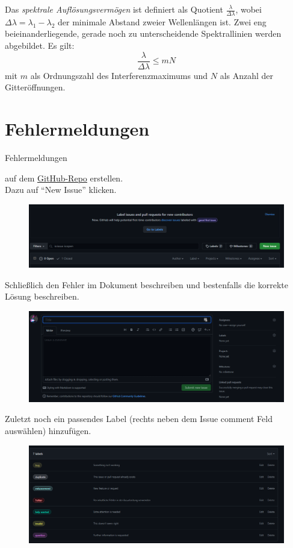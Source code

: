 \documentclass[a4paper, 11pt, ngerman, parskip=half-]{scrartcl}
\begin{document}
Das \textit{spektrale Auflösungsvermögen} ist definiert als Quotient $\frac{\lambda}{\Delta \lambda}$, wobei $\Delta \lambda = \lambda_1 - \lambda_2$
der minimale Abstand zweier Wellenlängen ist. Zwei eng beieinanderliegende, gerade noch zu unterscheidende Spektrallinien werden abgebildet. Es gilt:
\begin{equation}
    \frac{\lambda}{\Delta \lambda} \leq mN
\end{equation}
mit $m$ als Ordnungszahl des Interferenzmaximums und $N$ als Anzahl der Gitteröffnungen.
\newpage


\section{Fehlermeldungen}
\label{sec:Fehler}
\hypertarget{Fehler}{Fehlermeldungen} auf dem \href{https://github.com/etschgi1/Ex2_Fragen/issues}{\underline{GitHub-Repo}} erstellen.\\
Dazu auf \enquote{New Issue} klicken.
\begin{figure}[H]
    \centering
    \includegraphics[width=15cm]{image/Misc/Issues.png}
\end{figure}
Schließlich den Fehler im Dokument beschreiben und bestenfalls die korrekte Lösung beschreiben.
\begin{figure}[H]
    \centering
    \includegraphics[width=15cm]{image/Misc/Issue_erstellen.png}
\end{figure}
Zuletzt noch ein passendes Label (rechts neben dem Issue comment Feld auswählen) hinzufügen.
\begin{figure}[H]
    \centering
    \includegraphics[width=15cm]{image/Misc/Labels.png}
\end{figure}
\end{document}
